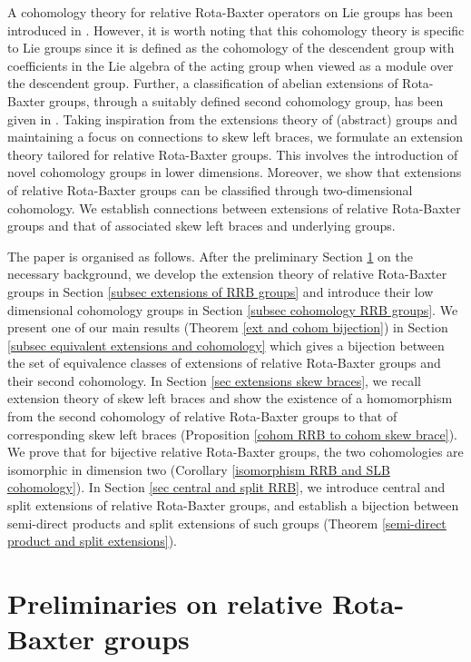 \documentclass[11pt]{amsart}
\theoremstyle{thrm}
\theoremstyle{plain}
\theoremstyle{definition}
\numberwithin{equation}{section}
\begin{document}
A cohomology theory for relative Rota-Baxter operators on Lie groups has been introduced in \cite{JYC22}. However, it is worth noting that this cohomology theory is specific to Lie groups since it is defined as the cohomology of the descendent group with coefficients in the Lie algebra of the acting group when viewed as a module over the  descendent group. Further, a classification of abelian extensions of Rota-Baxter groups,  through a suitably defined second cohomology group, has been given in \cite{AN2}. Taking inspiration from the  extensions theory of (abstract) groups and maintaining a focus on connections to skew left braces, we formulate an extension theory tailored for relative Rota-Baxter groups. This involves the introduction of novel cohomology groups in lower dimensions. Moreover, we show that extensions of relative Rota-Baxter groups can be classified through two-dimensional cohomology. We establish connections between extensions of  relative Rota-Baxter groups and that of associated skew left braces and underlying groups.
\par

The paper is organised as follows. After the preliminary Section \ref{section prelim} on the necessary background, we develop the extension theory of relative Rota-Baxter groups in Section \ref{subsec extensions of RRB groups} and  introduce their low dimensional cohomology groups in Section \ref{subsec cohomology RRB groups}. We present one of our main results (Theorem \ref{ext and cohom bijection}) in Section \ref{subsec equivalent extensions and cohomology} which gives a bijection between the set of equivalence classes of extensions of relative Rota-Baxter groups and their second cohomology.  In Section \ref{sec extensions skew braces}, we recall extension theory of skew left braces and show the existence of a homomorphism from the second cohomology of relative Rota-Baxter groups to that of corresponding skew left braces (Proposition \ref{cohom RRB to cohom skew brace}). We prove that for bijective relative Rota-Baxter groups, the two cohomologies are isomorphic in dimension two (Corollary \ref{isomorphism RRB and SLB cohomology}). In Section \ref{sec central and split RRB}, we introduce central and split extensions of relative Rota-Baxter groups, and establish a bijection between semi-direct products and split extensions of such groups (Theorem \ref{semi-direct product and split extensions}).
\medskip


\section{Preliminaries on relative Rota-Baxter groups}\label{section prelim}
	
\end{document}

